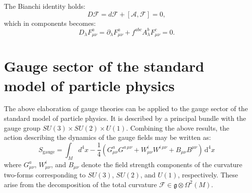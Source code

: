 The Bianchi identity holds:
\[
D\mathscr{F} = d\mathscr{F} + [\mathcal{A}, \mathscr{F}] = 0,
\]
which in components becomes:
\[
D_\lambda F_{\mu\nu}^a 
= \partial_\lambda F_{\mu\nu}^a + f^{abc} A_\lambda^b F_{\mu\nu}^c = 0.
\]


\section{Gauge sector of the standard model of particle physics}

The above elaboration of gauge theories can be applied to the gauge sector of the standard model of particle physics. It is described by a principal bundle with the gauge group \( SU(3) \times SU(2) \times U(1) \). Combining the above results, the action describing the dynamics of the gauge fields may be written as:
\[
S_{\text{gauge}} =  \int_M d^4x -\frac{1}{4}\left( G_{\mu\nu}^{a} G^{a\,\mu\nu} + W_{\mu\nu}^{i} W^{i\,\mu\nu} + B_{\mu\nu} B^{\mu\nu} \right) \, \mathrm{d}^4x
\]
where \( G_{\mu\nu}^a \), \( W_{\mu\nu}^i \), and \( B_{\mu\nu} \) denote the field strength components of the curvature two-forms corresponding to \( SU(3) \), \( SU(2) \), and \( U(1) \), respectively. These arise from the decomposition of the total curvature \( \mathscr{F} \in \mathfrak{g} \otimes \Omega^2(M) \). 

